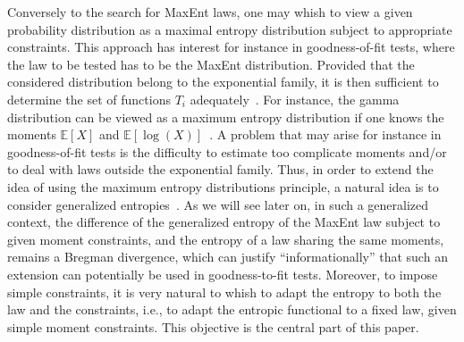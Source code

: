 \documentclass[english,sort&compress]{elsarticle}
\theoremstyle{definition}
\theoremstyle{plain}
\theoremstyle{plain}
\newcommand{\Esp}[1]{\mathbb{E}\left[ #1 \right]}
\begin{document}
Conversely  to the  search  for  MaxEnt laws,  one  may whish  to  view a  given
probability  distribution   as  a   maximal  entropy  distribution   subject  to
appropriate   constraints.   This   approach  has   interest  for   instance  in
goodness-of-fit  tests,  where  the law  to  be  tested  has  to be  the  MaxEnt
distribution.   Provided   that  the  considered  distribution   belong  to  the
exponential  family, it is  then sufficient  to determine  the set  of functions
$T_i$  adequately~\cite{Gok75,  Kap89,   CovTho06}.   For  instance,  the  gamma
distribution can  be viewed as a  maximum entropy distribution if  one knows the
moments  $\Esp X$  and $\Esp{\log(X)}$~\cite{Kap89,  CovTho06,  ParBer09, Gok75,
  Gok83}. A problem that may arise  for instance in goodness-of-fit tests is the
difficulty to estimate  too complicate moments and/or to  deal with laws outside
the exponential family.  Thus, in order  to extend the idea of using the maximum
entropy  distributions principle,  a  natural idea  is  to consider  generalized
entropies~\cite{Ren61, Var66, HavCha67, Csi67, Dar70, AczDar75, DarJar79, Tsa88,
  Sal87, SalMen93, Sal94, LieVaj06, Bas13}.  As  we will see later on, in such a
generalized context, the difference of the generalized entropy of the MaxEnt law
subject to given  moment constraints, and the entropy of a  law sharing the same
moments,  remains a  Bregman divergence,  which can  justify ``informationally''
that  such  an extension  can  potentially  be  used in  goodness-to-fit  tests.
Moreover, to impose simple constraints, it is very natural to whish to adapt the
entropy  to both  the  law and  the  constraints, i.e.,  to  adapt the  entropic
functional to a  fixed law, given simple moment  constraints.  This objective is
the central part of this paper.
\end{document}
